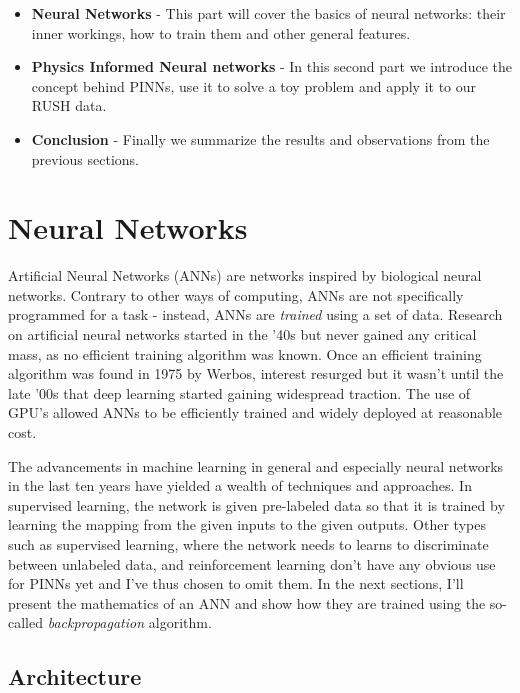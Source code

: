 \documentclass[12pt,a4paper,]{Dissertate}
\providecommand{\tightlist}{%
  \setlength{\itemsep}{0pt}\setlength{\parskip}{0pt}}
\begin{document}
\begin{itemize}
\tightlist
\item
  \textbf{Neural Networks} - This part will cover the basics of neural
  networks: their inner workings, how to train them and other general
  features.
\item
  \textbf{Physics Informed Neural networks} - In this second part we
  introduce the concept behind PINNs, use it to solve a toy problem and
  apply it to our RUSH data.
\item
  \textbf{Conclusion} - Finally we summarize the results and
  observations from the previous sections.
\end{itemize}

\hypertarget{neural-networks}{%
\section{Neural Networks}\label{neural-networks}}

Artificial Neural Networks (ANNs) are networks inspired by biological
neural networks. Contrary to other ways of computing, ANNs are not
specifically programmed for a task - instead, ANNs are \emph{trained}
using a set of data. Research on artificial neural networks started in
the '40s but never gained any critical mass, as no efficient training
algorithm was known. Once an efficient training algorithm was found in
1975 by Werbos, interest resurged but it wasn't until the late '00s that
deep learning started gaining widespread traction. The use of GPU's
allowed ANNs to be efficiently trained and widely deployed at reasonable
cost.

The advancements in machine learning in general and especially neural
networks in the last ten years have yielded a wealth of techniques and
approaches. In supervised learning, the network is given pre-labeled
data so that it is trained by learning the mapping from the given inputs
to the given outputs. Other types such as supervised learning, where the
network needs to learns to discriminate between unlabeled data, and
reinforcement learning don't have any obvious use for PINNs yet and I've
thus chosen to omit them. In the next sections, I'll present the
mathematics of an ANN and show how they are trained using the so-called
\emph{backpropagation} algorithm.

\hypertarget{architecture}{%
\subsection{Architecture}\label{architecture}}
\end{document}
